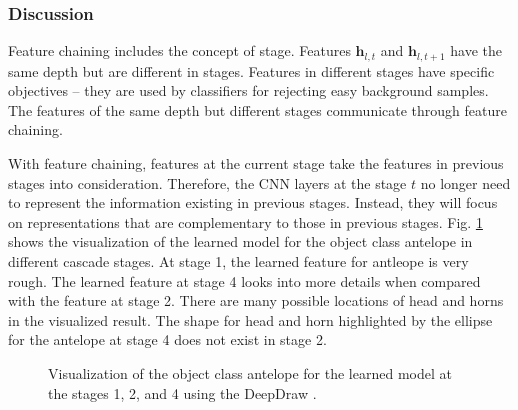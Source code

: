 \documentclass[10pt,twocolumn,letterpaper]{article}
\begin{document}
\subsubsection{Discussion}
Feature chaining includes the concept of stage.  Features $\mathbf{h}_{l, t}$ and $\mathbf{h}_{l, t+1}$ have the same depth but are different in stages. Features in different stages have specific objectives -- they are used by classifiers for rejecting easy background samples. The features of the same depth but different stages communicate through feature chaining.

With feature chaining, features at the current stage take the features in previous stages into consideration. Therefore, the CNN layers at the stage $t$ no longer need to represent the information existing in previous stages. Instead, they will focus  on representations that are complementary to those in previous stages. Fig. \ref{fig:Visualize} shows the visualization of the learned model for the object class antelope in different cascade stages. At stage 1, the learned feature for antleope is very rough. The learned feature at stage 4 looks into more details when compared with the feature at stage 2. There are many possible locations of head and horns in the visualized result. The shape for head and horn highlighted by the ellipse for the antelope at stage 4 does not exist in stage 2. 


\begin{figure}
\begin{center}
 \centerline{}
\end{center}
\vspace{-10pt}
   \caption{Visualization of the object class antelope for the learned model at the stages 1, 2, and 4 using the DeepDraw \cite{web:deepDraw}. }
\label{fig:Visualize}
\end{figure}

\end{document}
